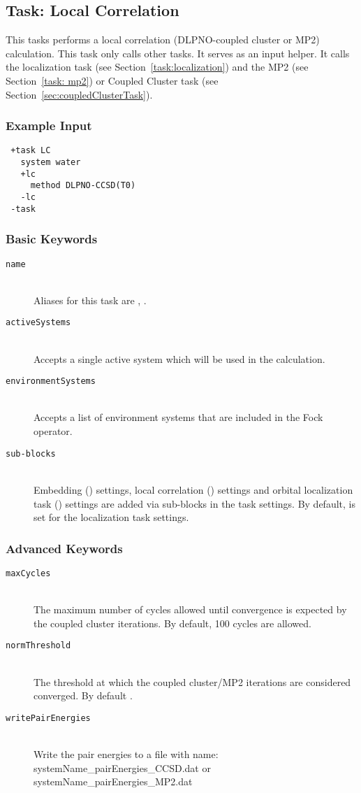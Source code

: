 \subsection{Task: Local Correlation}\label{task:localCorrelation}
This tasks performs a local correlation (DLPNO-coupled cluster or MP2) calculation. This task only
calls other tasks. It serves as an input helper. It calls the localization task
(see Section~\ref{task:localization}) and the MP2 (see Section~\ref{task: mp2}) or Coupled Cluster task
(see Section~\ref{sec:coupledClusterTask}).
\subsubsection{Example Input}
\begin{lstlisting}
 +task LC
   system water
   +lc
     method DLPNO-CCSD(T0)
   -lc
 -task
\end{lstlisting}
\subsubsection{Basic Keywords}
\begin{description}
 \item [\texttt{name}]\hfill \\
   Aliases for this task are , .
 \item [\texttt{activeSystems}]\hfill \\
   Accepts a single active system which will be used in the calculation.
 \item [\texttt{environmentSystems}]\hfill \\
   Accepts a list of environment systems that are included in the Fock operator.
 \item [\texttt{sub-blocks}]\hfill \\
  Embedding () settings, local correlation () settings and
  orbital localization task () settings are added via sub-blocks in the task settings.
  By default,  is set for the localization task settings.
\end{description}
\subsubsection{Advanced Keywords}
\begin{description}
  \item [\texttt{maxCycles}]\hfill \\
  The maximum number of cycles allowed until convergence is expected by the coupled cluster iterations.
  By default, 100 cycles are allowed.
  \item [\texttt{normThreshold}]\hfill \\
  The threshold at which the coupled cluster/MP2 iterations are considered converged. By default .
  \item [\texttt{writePairEnergies}]\hfill \\
  Write the pair energies to a file with name: systemName\_pairEnergies\_CCSD.dat or systemName\_pairEnergies\_MP2.dat
\end{description}
